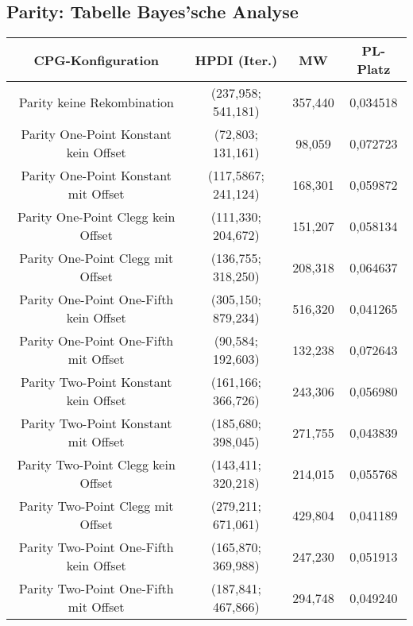 \subsection{Parity: Tabelle Bayes'sche Analyse}
\label{subsec:appendixTabelleBayesParity}
\begin{table}[H]
	\centering
	\begin{tabular}{c | c | c | c}
		\textbf{CPG-Konfiguration} & \textbf{HPDI (Iter.)} & \textbf{MW} & \textbf{PL-Platz}\\
		\hline
		Parity keine Rekombination & (237,958; 541,181) & \color{red}357,440\color{black} & \color{red}0,034518\color{black}\\
		\hline
		\hline
		Parity One-Point Konstant kein Offset & \color{Green}(72,803; 131,161)\color{black} & \color{Green}98,059\color{black} & \color{Green} 0,072723 \color{black}\\
		\hline
		Parity One-Point Konstant mit Offset & (117,5867; 241,124) & 168,301 & 0,059872\\
		\hline
		Parity One-Point Clegg kein Offset & \color{Green}(111,330; 204,672)\color{black} & \color{Green}151,207\color{black} & 0,058134\\
		\hline
		Parity One-Point Clegg mit Offset & (136,755; 318,250) & 208,318 & \color{Green}0,064637\color{black}\\
		\hline
		Parity One-Point One-Fifth kein Offset & \color{red}(305,150; 879,234)\color{black} & \color{red}516,320\color{black} & 0,041265\\
		\hline
		Parity One-Point One-Fifth mit Offset & \color{Green}(90,584; 192,603)\color{black} & \color{Green}132,238\color{black} & \color{Green}0,072643 \color{black}\\
		\hline
		\hline
		Parity Two-Point Konstant kein Offset & (161,166; 366,726) & 243,306 & 0,056980\\
		\hline
		Parity Two-Point Konstant mit Offset & (185,680; 398,045) & 271,755 & 0,043839\\
		\hline
		Parity Two-Point Clegg kein Offset & (143,411; 320,218) & 214,015 & 0,055768\\
		\hline
		Parity Two-Point Clegg mit Offset & \color{red}(279,211; 671,061)\color{black} & \color{red}429,804\color{black} & 0,041189\\
		\hline
		Parity Two-Point One-Fifth kein Offset & (165,870; 369,988) & 247,230 & 0,051913\\
		\hline
		Parity Two-Point One-Fifth mit Offset & (187,841; 467,866) & 294,748 & 0,049240\\

\end{tabular}
\end{table}
